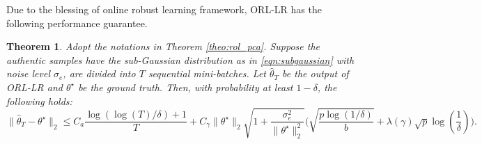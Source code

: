 \documentclass[11pt]{article}
\newtheorem{theorem}{Theorem}
\begin{document}
%

Due to the blessing of online robust learning framework, ORL-LR has the following performance guarantee. 

\begin{theorem}
	\label{theo:rol_sr}
	Adopt the notations in Theorem \ref{theo:rol_pca}.
	Suppose  the authentic samples have the sub-Gaussian distribution as in \eqref{eqn:subgaussian}  with noise level $ \sigma_e $, are divided into $ T $ sequential mini-batches. Let $ \widehat{\theta}_T $ be the output of ORL-LR and $ \theta^\star $ be the ground truth. Then, with probability at least $ 1-\delta $,  the following holds:
	\begin{equation*}
	\|\widehat{\theta}_T-\theta^\star\|_2  \leq   C_a \frac{\log(\log(T)/\delta) + 1}{T} 
 + C_\gamma \|\theta^\star\|_2\sqrt{1+\frac{\sigma_e^2}{\|\theta^\star\|_2^2}}\Bigg(\sqrt{\frac{p\log (1/\delta)}{b}}  + \lambda(\gamma)\sqrt{p}\log (\frac{1}{\delta})\Bigg).
	\end{equation*}	
\end{theorem}







	
\end{document}
